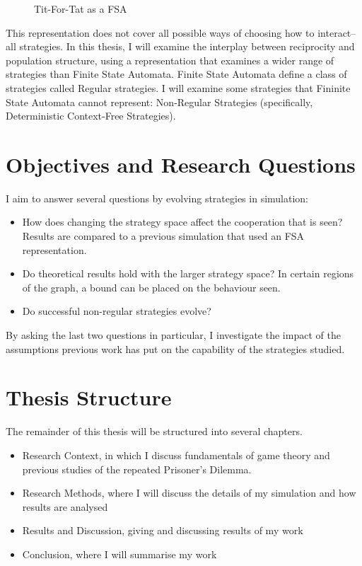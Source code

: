 \documentclass[a4paper,11pt,bcshonoursthesis,singlespace,twoside,thesisdraft,pdflatex]{cssethesis}
\begin{document}
\begin{figure}
\centering
\label{fig:fsa.tft.lang}
\caption{Tit-For-Tat as a FSA}
\end{figure}

This representation does not cover all possible ways of choosing how to interact-- all strategies. In this thesis, I will examine the interplay between reciprocity and population structure, using a representation that examines a wider range of strategies than Finite State Automata. Finite State Automata define a class of strategies called Regular strategies. I will examine some strategies that Fininite State Automata cannot represent: Non-Regular Strategies (specifically, Deterministic Context-Free Strategies).
\section{Objectives and Research Questions}
I aim to answer several questions by evolving strategies in simulation:
\begin{itemize}
\item How does changing the strategy space affect the cooperation that is seen? 
Results are compared to a previous simulation that used an FSA representation. 
\item Do theoretical results hold with the larger strategy space? In certain regions of the graph, a bound can be placed on the behaviour seen. 
\item Do successful non-regular strategies evolve?
\end{itemize}
 
By asking the last two questions in particular, I investigate the impact of the assumptions previous work has put on the capability of the strategies studied. 

\section{Thesis Structure}
The remainder of this thesis will be structured into several chapters.
\begin{itemize}
\item Research Context, in which I discuss fundamentals of game theory and previous studies of the repeated Prisoner's Dilemma.
\item Research Methods, where I will discuss the details of my simulation and how results are analysed
\item Results and Discussion, giving and discussing results of my work
\item Conclusion, where I will summarise my work
\end{itemize}
\end{document}

